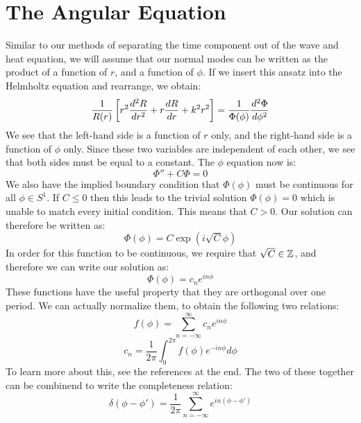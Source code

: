 \documentclass{paper}
\begin{document}
\section{The Angular Equation}
Similar to our methods of separating the time component out of the wave and heat equation, we will assume that our normal modes can be written as the product of a function of $r$, and a function of $\phi$. If we insert this ansatz into the Helmholtz equation and rearrange, we obtain:
\begin{equation}
\frac{1}{R(r)}\left[
 r^2\frac{d ^2 R}{d r^2}+r\frac{d R}{d r}+k^2 r^2
\right]=
\frac{1}{\Phi(\phi)}\frac{d ^2\Phi}{d \phi^2}
\end{equation}
We see that the left-hand side is a function of $r$ only, and the right-hand side is a function of $\phi$ only. Since these two variables are independent of each other, we see that both sides must be equal to a constant. The $\phi$ equation now is:
\begin{equation}\Phi''+C\Phi=0\end{equation}
We also have the implied boundary condition that $\Phi(\phi)$ must be continuous for all $\phi\in S^1$. If $C\leq 0$ then this leads to the trivial solution $\Phi(\phi)=0$ which is unable to match every initial condition. This means that $C>0$. Our solution can therefore be written as:
\begin{equation}\Phi(\phi)=C \exp(i \sqrt{C} \phi)\end{equation}
In order for this function to be continuous, we require that $\sqrt{C}\in\mathbb{Z}$, and therefore we can write our solution as:
\begin{equation}\Phi(\phi)=c_n e^{i n\phi}\end{equation}
These functions have the useful property that they are orthogonal over one period. We can actually normalize them, to obtain the following two relations:
\begin{equation}f(\phi)=\sum_{n=-\infty}^\infty c_n e^{i n\phi}\end{equation}
\begin{equation}c_n = \frac{1}{2\pi}\int_0^{2\pi} f(\phi) e^{- i n \phi}d\phi\end{equation}
To learn more about this, see the references at the end. The two of these together can be combinend to write the completeness relation:
\begin{equation}\delta(\phi-\phi')=\frac{1}{2\pi}\sum_{n=-\infty}^\infty e^{in(\phi-\phi')}\end{equation}
\end{document}
